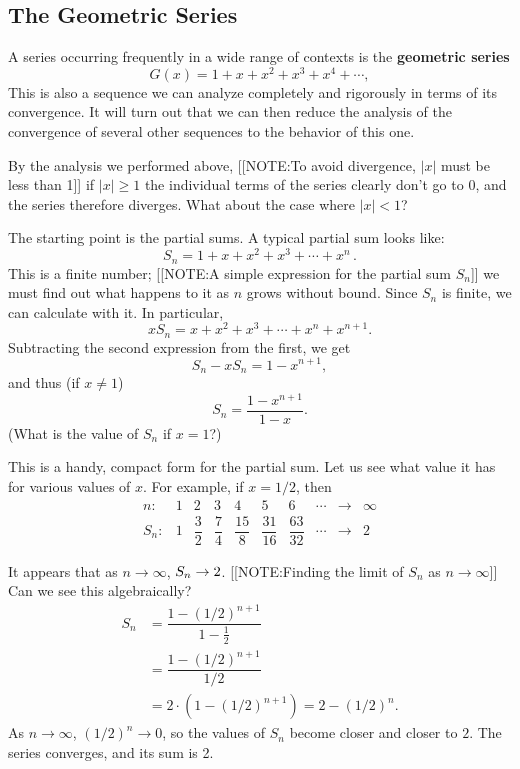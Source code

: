 \subsection{The Geometric Series}
\label{subsec:the-geometric-series}

A series occurring frequently in a wide range of contexts is the {\bf
  geometric series}
\[
G(x) = 1 + x + x^2 +x^3 + x^4 +\cdots ,
\]
This is also a sequence we can analyze completely and rigorously in
terms of its convergence.  It will turn out that we can then reduce
the analysis of the convergence of several other sequences to the
behavior of this one.

By the analysis we performed above, 
[[NOTE:To avoid divergence, $|x|$ must be less than 1]]
if $|x|\ge 1$ the individual terms of the series clearly don't go to
0, and the series therefore diverges.  What about the case where
$|x|<1$?



The starting point is the partial sums.  A typical partial sum looks like:
        \[
S_n =  1 +  x +  x^2 +  x^3 + \cdots +  x^n\, .
\]
This is a finite number; 
[[NOTE:A simple expression for the partial sum $S_n$]]
we must find out what happens to it as $n$ grows without bound.  Since
$S_n$ is finite, we can calculate with it.  In particular,
\[
xS_n =   x +  x^2 +  x^3 + \cdots +  x^n +  x^{n+1}.
\]
Subtracting the second expression from the first, we get
        \[
S_n - xS_n = 1  -  x^{n+1},
\]
and thus (if $x \neq 1$)
        \[
S_n =   \dfrac{1 - x^{n+1}}{1-x}.
\]
(What is the value of $S_n$ if $x=1$?)

This is a handy, compact form for the partial sum.  Let us see what value it has  for various values of $x$.  For example, if $x = 1/2$, then
\[
\begin{array}{rccccccccc}
n: & 1 & 2 & 3 & 4 & 5 & 6 & \cdots & \to & \infty
                \\[.07in]
S_n: & 1 & \dfrac{3}{2}  & \dfrac{7}{4}  & \dfrac{15}{8}  
                & \dfrac{31}{16}  & \dfrac{63}{32}  & \cdots & \to 
                & 2  
\end{array}
\]


It appears that as $n \to \infty$, $S_n \to 2 \/$.  
[[NOTE:Finding the limit of $S_n$ as $n \to \infty$]]
Can we see this algebraically?
\begin{align*}
S_n &= \dfrac{1 - (1/2)^{n+1}}{1 - \tfrac{1}{2}} \\
    &= \dfrac{1 - (1/2)^{n+1}}{1/2} \\
    &= 2 \cdot (1 - (1/2)^{n+1})
     = 2-(1/2)^n. 
\end{align*}
As $n \to \infty$, $(1/2)^n \to 0$, so the values of $S_n$ become
closer and closer to $2$.  The series converges, and its sum
is 2.

